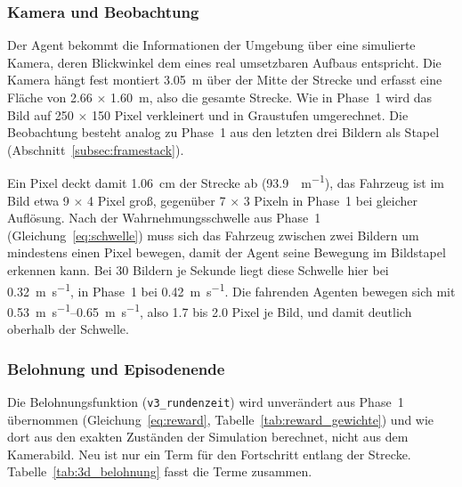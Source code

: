 \subsubsection{Kamera und Beobachtung}
\label{subsec:3d_kamera}

Der Agent bekommt die Informationen der Umgebung über eine simulierte Kamera, deren Blickwinkel dem eines real umsetzbaren Aufbaus entspricht. Die Kamera hängt fest montiert \SI{3.05}{\meter} über der Mitte der Strecke und erfasst eine Fläche von \num{2.66} $\times$ \SI{1.60}{\meter}, also die gesamte Strecke. Wie in Phase~1 wird das Bild auf \num{250} $\times$ \num{150} Pixel verkleinert und in Graustufen umgerechnet. Die Beobachtung besteht analog zu Phase~1 aus den letzten drei Bildern als Stapel (Abschnitt~\ref{subsec:framestack}).

Ein Pixel deckt damit \SI{1.06}{\centi\meter} der Strecke ab (\SI{93.9}{\px\per\meter}), das Fahrzeug ist im Bild etwa \num{9} $\times$ \num{4} Pixel groß, gegenüber \num{7} $\times$ \num{3} Pixeln in Phase~1 bei gleicher Auflösung. Nach der Wahrnehmungsschwelle aus Phase~1 (Gleichung~\eqref{eq:schwelle}) muss sich das Fahrzeug zwischen zwei Bildern um mindestens einen Pixel bewegen, damit der Agent seine Bewegung im Bildstapel erkennen kann. Bei 30 Bildern je Sekunde liegt diese Schwelle hier bei \SI{0.32}{\meter\per\second}, in Phase~1 bei \SI{0.42}{\meter\per\second}. Die fahrenden Agenten bewegen sich mit \SIrange{0.53}{0.65}{\meter\per\second}, also \num{1.7} bis \num{2.0} Pixel je Bild, und damit deutlich oberhalb der Schwelle.

\subsubsection{Belohnung und Episodenende}
\label{subsec:3d_belohnung}

Die Belohnungsfunktion (\texttt{v3\_rundenzeit}) wird unverändert aus Phase~1 übernommen (Gleichung~\eqref{eq:reward}, Tabelle~\ref{tab:reward_gewichte}) und wie dort aus den exakten Zuständen der Simulation berechnet, nicht aus dem Kamerabild. Neu ist nur ein Term für den Fortschritt entlang der Strecke. Tabelle~\ref{tab:3d_belohnung} fasst die Terme zusammen.

